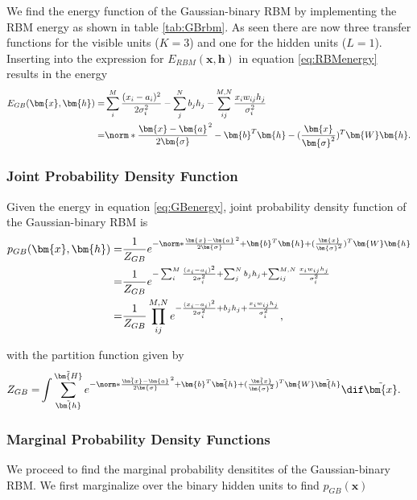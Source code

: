 We find the energy function of the Gaussian-binary RBM by implementing the RBM energy as shown in table \ref{tab:GBrbm}. As seen there are now three transfer functions for the visible units ($K=3$) and one for the hidden units ($L=1$).
Inserting into the expression for $E_{RBM}(\bm{x},\bm{h})$ in equation \ref{eq:RBMenergy} results in the energy
\begin{align}
	E_{GB}(\bm{x}, \bm{h}) =& \sum_i^M \frac{(x_i - a_i)^2}{2\sigma_i^2}
	- \sum_j^N b_j h_j 
	-\sum_{ij}^{M,N} \frac{x_i w_{ij} h_j}{\sigma_i^2} \nonumber \\
	=& \norm*{\frac{\bm{x} -\bm{a}}{2\bm{\sigma}}}^2 - \bm{b}^T \bm{h} 
	- (\frac{\bm{x}}{\bm{\sigma}^2})^T \bm{W}\bm{h} . \label{eq:GBenergy}
\end{align}



\subsubsection{Joint Probability Density Function}

Given the energy in equation \ref{eq:GBenergy}, joint probability density function of the Gaussian-binary RBM is
\begin{align}
	p_{GB} (\bm{x}, \bm{h}) =& \frac{1}{Z_{GB}} e^{-\norm*{\frac{\bm{x} -\bm{a}}{2\bm{\sigma}}}^2 + \bm{b}^T \bm{h} 
	+ (\frac{\bm{x}}{\bm{\sigma}^2})^T \bm{W}\bm{h}} \nonumber \\
	=& \frac{1}{Z_{GB}} e^{- \sum_i^M \frac{(x_i - a_i)^2}{2\sigma_i^2}
	+ \sum_j^N b_j h_j 
	+\sum_{ij}^{M,N} \frac{x_i w_{ij} h_j}{\sigma_i^2}} \nonumber \\
	=& \frac{1}{Z_{GB}} \prod_{ij}^{M,N} e^{-\frac{(x_i - a_i)^2}{2\sigma_i^2}
	+ b_j h_j 
	+\frac{x_i w_{ij} h_j}{\sigma_i^2}} ,
\end{align}

with the partition function given by
\begin{align}
	Z_{GB} =& \int \sum_{\tilde{\bm{h}}}^{\tilde{\bm{H}}} e^{-\norm*{\frac{\tilde{\bm{x}} -\bm{a}}{2\bm{\sigma}}}^2 + \bm{b}^T \tilde{\bm{h}} 
	+ (\frac{\tilde{\bm{x}}}{\bm{\sigma}^2})^T \bm{W}\tilde{\bm{h}}} \dif \tilde{\bm{x}} .
\end{align}

\subsubsection{Marginal Probability Density Functions}
We proceed to find the marginal probability densitites of the Gaussian-binary RBM. We first marginalize over the binary hidden units to find $p_{GB} (\bm{x})$

